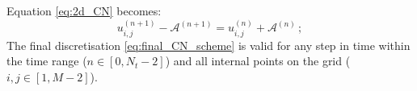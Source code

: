 Equation \eqref{eq:2d_CN} becomes:
\begin{equation}\label{eq:final_CN_scheme}
    u_{i,j}^{(n+1)} - \mathcal{A}^{(n+1)} = u_{i, j}^{(n)} + \mathcal{A}^{(n)} \, ;
\end{equation}
The final discretisation \eqref{eq:final_CN_scheme} is valid for any step in time within the time range ($n\in[0, N_t-2]$) and all internal points on the grid ($i,j \in [1, M-2]$).
